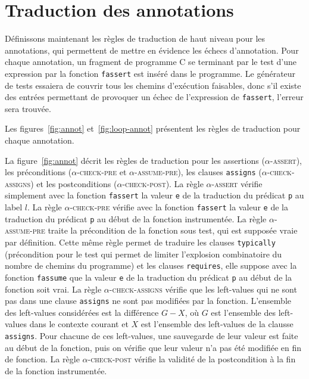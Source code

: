 \section{Traduction des annotations \eacsl}
\label{sec:annot}


Définissons maintenant les règles de traduction de haut niveau pour les
annotations, qui permettent de mettre en évidence les échecs d'annotation.
Pour chaque annotation, un fragment de programme C se terminant par le test
d'une expression par la fonction \lstinline'fassert' est inséré dans le
programme.
Le générateur de tests essaiera de couvrir tous les chemins d'exécution
faisables, donc s'il existe des entrées permettant de provoquer un échec de
l'expression de \lstinline'fassert', l'erreur sera trouvée.

Les figures~\ref{fig:annot} et~\ref{fig:loop-annot} présentent les
règles de traduction pour chaque annotation.

La figure~\ref{fig:annot} décrit les règles de traduction pour les assertions
(\textsc{$\alpha$-assert}), les préconditions (\textsc{$\alpha$-check-pre} et
\textsc{$\alpha$-assume-pre}), les clauses \lstinline'assigns'
(\textsc{$\alpha$-check-assigns}) et les postconditions
(\textsc{$\alpha$-check-post}).
La règle \textsc{$\alpha$-assert} vérifie simplement avec la fonction
\lstinline'fassert' la valeur \lstinline'e' de la traduction du prédicat
\lstinline'p' au label $l$.
La règle \textsc{$\alpha$-check-pre} vérifie avec la fonction
\lstinline'fassert' la valeur \lstinline'e' de la traduction du prédicat
\lstinline'p' au début de la fonction instrumentée.
La règle \textsc{$\alpha$-assume-pre} traite la précondition de la fonction sous
test, qui est supposée vraie par définition.
Cette même règle permet de traduire les clauses \lstinline'typically'
(précondition pour le test qui permet de limiter l'explosion combinatoire du
nombre de chemins du programme) et les clauses \lstinline'requires', elle
suppose avec la fonction \lstinline'fassume' que la valeur \lstinline'e' de la
traduction du prédicat \lstinline'p' au début de la fonction soit vrai.
La règle \textsc{$\alpha$-check-assigns} vérifie que les left-values qui ne sont
pas dans une clause \lstinline'assigns' ne sont pas modifiées par la fonction.
L'ensemble des left-values considérées est la différence $G-X$, où $G$ est
l'ensemble des left-values dans le contexte courant et $X$ est l'ensemble des
left-values de la clausse \lstinline'assigns'.
Pour chacune de ces left-values, une sauvegarde de leur valeur est faite au
début de la fonction, puis on vérifie que leur valeur n'a pas été modifiée en
fin de fonction.
La règle \textsc{$\alpha$-check-post} vérifie la validité de la postcondition
à la fin de la fonction instrumentée.

